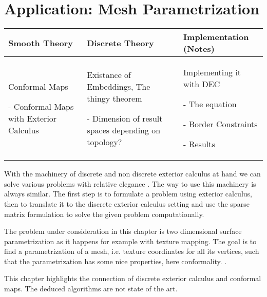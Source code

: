 \chapter{Application: Mesh Parametrization}
	\begin{longtable}{|p{4.5cm}|p{4.5cm}|p{4.5cm}|}
		\hline
		Smooth Theory& Discrete Theory& Implementation (Notes)\\
		\hline
			Conformal Maps
			\begin{packed_enum}
				\item[-] Conformal Maps with Exterior Calculus
			\end{packed_enum}
			&
			Existance of Embeddings, The thingy theorem
			\begin{packed_enum}
				\item[-] Dimension of result spaces depending on topology?
			\end{packed_enum}
			 & 
			 Implementing it with DEC
			 \begin{packed_enum}
				\item[-] The equation
				\item[-] Border Constraints
				\item[-] Results
			\end{packed_enum}
			 \\		
		\hline
	\end{longtable}
	
With the machinery of discrete and non discrete exterior calculus at hand we can solve various problems with relative elegance . The way to use this machinery is always similar. The first step is to formulate a problem using exterior calculus, then to translate it to the discrete exterior calculus setting and use the sparse matrix formulation to solve the given problem computationally.

The problem under consideration in this chapter is two dimensional surface parametrization as it happens for example with texture mapping. The goal is to find a parametrization of a mesh, i.e. texture coordinates for all its vertices, such that the parametrization has some nice properties, here conformality.  . 

This chapter highlights the connection of discrete exterior calculus and conformal maps. The deduced algorithms are not state of the art. \note{[.....]}



